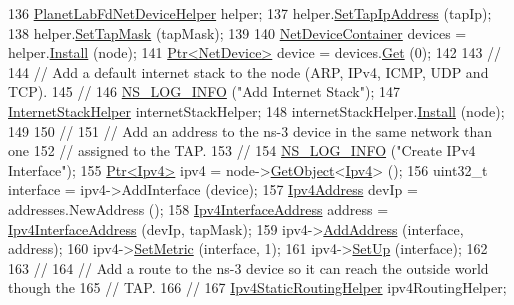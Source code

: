 \begin{DoxyCode}
136   \hyperlink{classns3_1_1PlanetLabFdNetDeviceHelper}{PlanetLabFdNetDeviceHelper} helper;
137   helper.\hyperlink{classns3_1_1PlanetLabFdNetDeviceHelper_ac66f980eff8589effa96dc55b8fa7e5d}{SetTapIpAddress} (tapIp);
138   helper.\hyperlink{classns3_1_1PlanetLabFdNetDeviceHelper_a5092147c1cf87212697fd91a2c1294c9}{SetTapMask} (tapMask);
139 
140   \hyperlink{classns3_1_1NetDeviceContainer}{NetDeviceContainer} devices = helper.\hyperlink{classns3_1_1FdNetDeviceHelper_af70d55cbb4f6411c33cacb84eb651ad5}{Install} (node);
141   \hyperlink{classns3_1_1Ptr}{Ptr<NetDevice>} device = devices.\hyperlink{classns3_1_1NetDeviceContainer_a677d62594b5c9d2dea155cc5045f4d0b}{Get} (0);
142 
143   \textcolor{comment}{//}
144   \textcolor{comment}{// Add a default internet stack to the node (ARP, IPv4, ICMP, UDP and TCP).}
145   \textcolor{comment}{//}
146   \hyperlink{group__logging_gafbd73ee2cf9f26b319f49086d8e860fb}{NS\_LOG\_INFO} (\textcolor{stringliteral}{"Add Internet Stack"});
147   \hyperlink{classns3_1_1InternetStackHelper}{InternetStackHelper} internetStackHelper;
148   internetStackHelper.\hyperlink{classns3_1_1InternetStackHelper_a6645b412f31283d2d9bc3d8a95cebbc0}{Install} (node);
149 
150   \textcolor{comment}{//}
151   \textcolor{comment}{// Add an address to the ns-3 device in the same network than one}
152   \textcolor{comment}{// assigned to the TAP.}
153   \textcolor{comment}{//}
154   \hyperlink{group__logging_gafbd73ee2cf9f26b319f49086d8e860fb}{NS\_LOG\_INFO} (\textcolor{stringliteral}{"Create IPv4 Interface"});
155   \hyperlink{classns3_1_1Ptr}{Ptr<Ipv4>} ipv4 = node->\hyperlink{classns3_1_1Object_a13e18c00017096c8381eb651d5bd0783}{GetObject}<\hyperlink{classns3_1_1Ipv4}{Ipv4}> ();
156   uint32\_t \textcolor{keyword}{interface }= ipv4->AddInterface (device);
157   \hyperlink{classns3_1_1Ipv4Address}{Ipv4Address} devIp = addresses.NewAddress ();
158   \hyperlink{classns3_1_1Ipv4InterfaceAddress}{Ipv4InterfaceAddress} address = \hyperlink{classns3_1_1Ipv4InterfaceAddress}{Ipv4InterfaceAddress} (devIp, 
      tapMask);
159   ipv4->\hyperlink{classns3_1_1Ipv4_ad203526cae6a4b86f1bb89e44d2b62f7}{AddAddress} (interface, address);
160   ipv4->\hyperlink{classns3_1_1Ipv4_a2b5632573b67957fabe2dfea248a57a3}{SetMetric} (interface, 1);
161   ipv4->\hyperlink{classns3_1_1Ipv4_a71b2f8acca4923aef907b50b3196bf23}{SetUp} (interface);
162 
163   \textcolor{comment}{//}
164   \textcolor{comment}{// Add a route to the ns-3 device so it can reach the outside world though the}
165   \textcolor{comment}{// TAP.}
166   \textcolor{comment}{//}
167   \hyperlink{classns3_1_1Ipv4StaticRoutingHelper}{Ipv4StaticRoutingHelper} ipv4RoutingHelper;

\end{DoxyCode}

